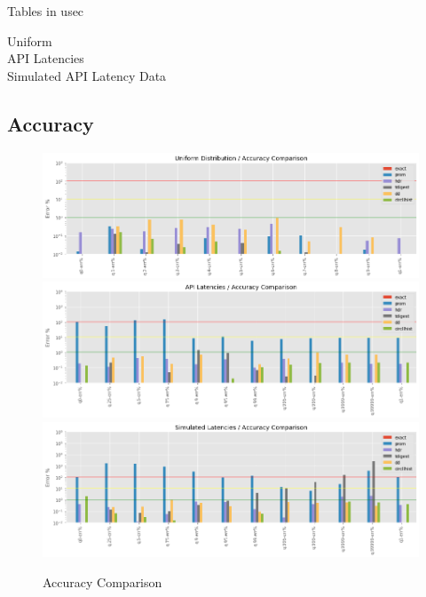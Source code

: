 \documentclass{article}
\theoremstyle{plain}
\theoremstyle{remark}
\begin{document}
Tables in usec

Uniform\\


API Latencies\\


Simulated API Latency Data\\


\clearpage
\subsection{Accuracy}

\begin{figure}
  \includegraphics[width=\textwidth]{evaluation/images/Uniform_Distribution_accuracy.png}
  \includegraphics[width=\textwidth]{evaluation/images/API_Latencies_accuracy.png}
  \includegraphics[width=\textwidth]{evaluation/images/Simulated_Latencies_accuracy.png}
  \caption{Accuracy Comparison}
\end{figure}
\end{document}
